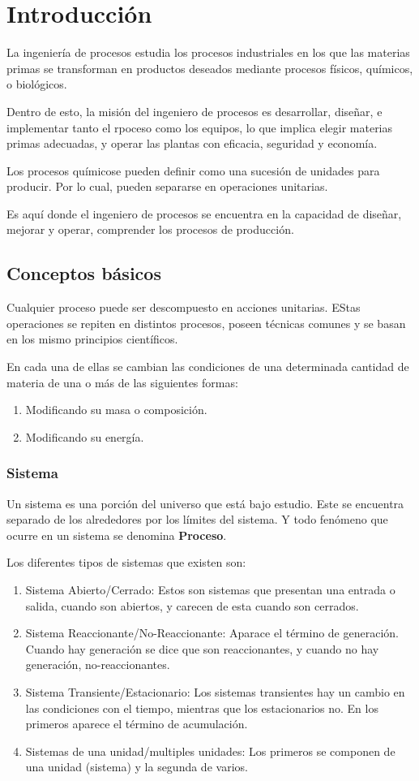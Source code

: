 \section{Introducción}

La ingeniería de procesos estudia los procesos industriales en los que las materias primas se transforman en productos deseados
mediante procesos físicos, químicos, o biológicos.


Dentro de esto, la misión del ingeniero de procesos es desarrollar, diseñar, e implementar
tanto el rpoceso como los equipos, lo que implica elegir materias primas adecuadas, y operar las plantas con eficacia, seguridad y economía.


Los procesos químicose pueden definir como una sucesión de unidades para producir. Por lo cual, pueden separarse en operaciones unitarias.


Es aquí donde el ingeniero de procesos se encuentra en la capacidad de diseñar, mejorar y operar,  comprender los procesos de producción.

\subsection{Conceptos básicos}

Cualquier proceso puede ser descompuesto en acciones unitarias. EStas operaciones se repiten en distintos procesos,
poseen técnicas comunes y se basan en los mismo principios científicos.


En cada una de ellas se cambian las condiciones de una determinada cantidad de materia de una o más de las siguientes formas:
\begin{enumerate}
    \item Modificando su masa o composición.
    \item Modificando su energía.
\end{enumerate}
\subsubsection{Sistema}
Un sistema es una porción del universo que está bajo estudio. Este se encuentra separado de los alrededores por los límites del sistema. 
Y todo fenómeno que ocurre en un sistema se denomina \textbf{Proceso}.

Los diferentes tipos de sistemas que existen son:
\begin{enumerate}
    \item Sistema Abierto/Cerrado: Estos son sistemas que presentan una entrada o salida, cuando son abiertos, y carecen de esta cuando son cerrados.
    \item Sistema Reaccionante/No-Reaccionante: Aparace el término de generación. Cuando hay generación se dice que son reaccionantes, y cuando no hay generación, no-reaccionantes.
    \item Sistema Transiente/Estacionario: Los sistemas transientes hay un cambio en las condiciones con el tiempo, mientras que los estacionarios no. En los primeros aparece el término de acumulación.
    \item Sistemas de una unidad/multiples unidades: Los primeros se componen de una unidad (sistema) y la segunda de varios.
\end{enumerate}

